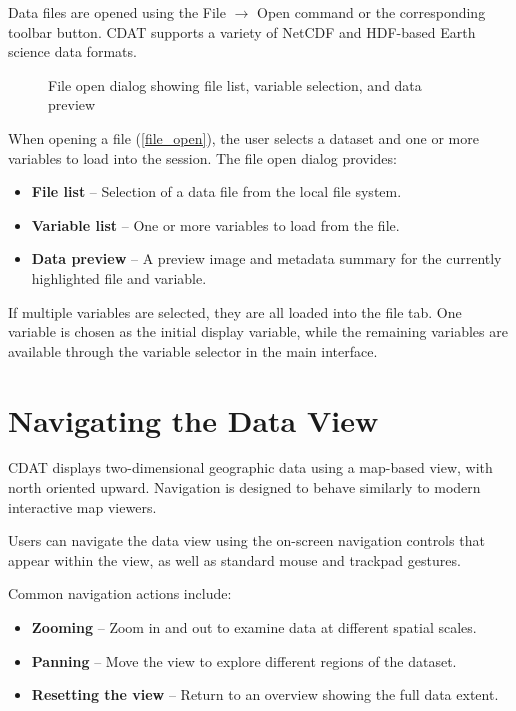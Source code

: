 Data files are opened using the {\gui File \(\rightarrow\) Open} command
or the corresponding toolbar button.  CDAT supports a variety of
NetCDF and HDF-based Earth science data formats.

\begin{figure}
  \begin{center}
    \caption[File open dialog]{
       File open dialog showing file list, variable selection,
       and data preview
    }
    \label{file_open}
  \end{center}
\end{figure}

When opening a file (\autoref{file_open}), the user selects a dataset
and one or more variables to load into the session. The file open dialog provides:
\begin{itemize}
  \item \textbf{File list} -- Selection of a data file from the local file system.
  \item \textbf{Variable list} -- One or more variables to load from the file.
  \item \textbf{Data preview} -- A preview image and metadata summary for the
        currently highlighted file and variable.
\end{itemize}
If multiple variables are selected, they are all loaded into the file tab.
One variable is chosen as the initial display variable, while the remaining 
variables are available through the variable selector in the main interface.

\section{Navigating the Data View}

CDAT displays two-dimensional geographic data using a map-based view,
with north oriented upward. Navigation is designed to behave similarly
to modern interactive map viewers.

Users can navigate the data view using the on-screen navigation controls
that appear within the view, as well as standard mouse and trackpad
gestures.

Common navigation actions include:
\begin{itemize}
  \item \textbf{Zooming} -- Zoom in and out to examine data at different
        spatial scales.
  \item \textbf{Panning} -- Move the view to explore different regions of
        the dataset.
  \item \textbf{Resetting the view} -- Return to an overview showing the
        full data extent.
\end{itemize}

